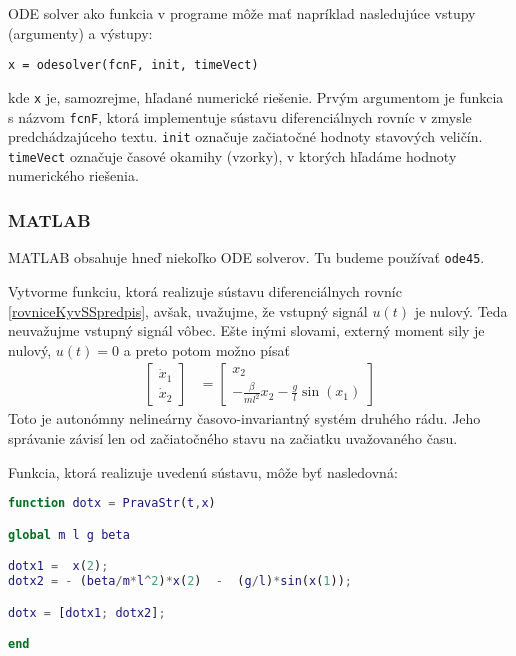 \documentclass[a4paper, 10pt, ]{article}
\begin{document}
ODE solver ako funkcia v programe môže mať napríklad nasledujúce vstupy (argumenty) a výstupy:

\begin{verbatim}
x = odesolver(fcnF, init, timeVect)
\end{verbatim}
kde \verb|x| je, samozrejme, hľadané numerické riešenie. Prvým argumentom je funkcia s názvom \verb|fcnF|, ktorá implementuje sústavu diferenciálnych rovníc v zmysle predchádzajúceho textu. \verb|init| označuje začiatočné hodnoty stavových veličín. \verb|timeVect| označuje časové okamihy (vzorky), v ktorých hľadáme hodnoty numerického riešenia.






\subsubsection{MATLAB}

\noindent
MATLAB obsahuje hneď niekoľko ODE solverov. Tu budeme používať \verb|ode45|.

Vytvorme funkciu, ktorá realizuje sústavu diferenciálnych rovníc \eqref{rovniceKyvSSpredpis}, avšak, uvažujme, že vstupný signál $u(t)$ je nulový. Teda neuvažujme vstupný signál vôbec. Ešte inými slovami, externý moment sily je nulový, $u(t) = 0$ a preto potom možno písať
\begin{align} \label{fajnVektRov0}
	\begin{bmatrix}
		\dot{x}_1 \\ \dot{x}_2
	\end{bmatrix}
	&=
	\begin{bmatrix}
		x_2 \\ - \frac{\beta}{ml^2} x_2 - \frac{g}{l} \sin(x_1)
	\end{bmatrix}
\end{align}
Toto je autonómny nelineárny časovo-invariantný systém druhého rádu. Jeho správanie závisí len od začiatočného stavu na začiatku uvažovaného času.

Funkcia, ktorá realizuje uvedenú sústavu, môže byť nasledovná:


\lstset{style=mystyle}
\begin{lstlisting}[language=Matlab, title=Celý súbor PravaStr.m]
function dotx = PravaStr(t,x)

global m l g beta

dotx1 =  x(2);
dotx2 = - (beta/m*l^2)*x(2)  -  (g/l)*sin(x(1));

dotx = [dotx1; dotx2];

end
\end{lstlisting}
\end{document}
